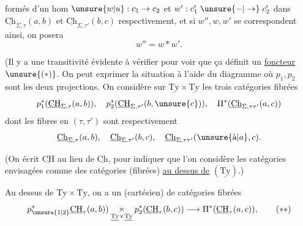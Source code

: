 formés d'un hom $\unsure{w|u}:c_1\to c_2$ et $w':c'_1\mathrel{\unsure{-|\to}}c'_2$ dans $\underline{\mathrm{Ch}}_{\Sigma,\tau}(a,b)$ et $\underline{\mathrm{Ch}}_{\Sigma,\tau'}(b,c)$ respectivement, et si $w'',w,w'$ se correspondent ainsi, on posera
\[
w''=w*w'.
\]

(Il y a une transitivité évidente à vérifier pour voir que ça définit un \uline{foncteur} $\unsure{(*)}$. On peut exprimer la situation à l'aide du diagramme
où $p_1,p_2$ sont les deux projections. On considère sur $\underline{\mathrm{Ty}}\times \underline{\mathrm{Ty}}$ les trois catégories fibrées
\[
p_1^*(\underline{\mathrm{CH}}_{\Sigma,\tau}(a,b)),\quad
p_2^*(\underline{\mathrm{CH}}_{\Sigma,\tau'}(b,\unsure{c})),\quad
\Pi^*(\underline{\mathrm{Ch}}_{\Sigma,\tau\tau'}(a,c))
\]
dont les fibres en $(\tau,\tau')$ sont respectivement
\[
\underline{\mathrm{Ch}}_{\Sigma,\tau}(a,b),\quad
\underline{\mathrm{Ch}}_{\Sigma,\tau'}(b,c),\quad
\underline{\mathrm{Ch}}_{\Sigma,\tau\tau'}(\unsure{\text{à}|a},c).
\]

(On  écrit $\underline{\mathrm{CH}}$ au lieu de $\underline{\mathrm{Ch}}$, pour indiquer que l'on considère les catégories envisagées comme des catégories (fibrées) \uline{au dessus de} $(\underline{\mathrm{Ty}})$.)

Au dessus de $\underline{\mathrm{Ty}}\times \underline{\mathrm{Ty}}$, on a un  (cartésien) de catégories fibrées 
\[
p_{\unsure{1|2}}^*\underline{\mathrm{CH}}_{\tau}(a,b))\underset{\underline{\mathrm{Ty}}\times \underline{\mathrm{Ty}}}{\times}
p_2^*(\underline{\mathrm{CH}}_{\tau}(b,c))\longrightarrow\Pi^*(\underline{\mathrm{CH}}_{\tau}(a,c)),\tag*{$(**)$}
\]
